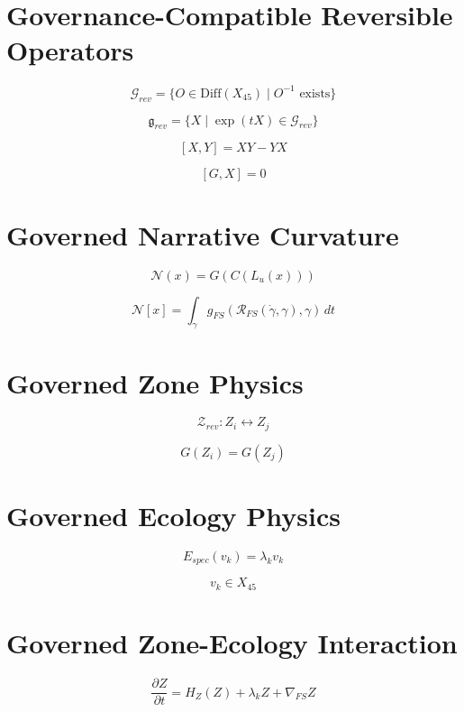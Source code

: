 \section*{Governance-Compatible Reversible Operators}

\[
\mathcal{G}_{rev}
= \{ O \in \mathrm{Diff}(X_{45}) \mid O^{-1} \text{ exists} \}
\]

\[
\mathfrak{g}_{rev}
= \{ X \mid \exp(tX) \in \mathcal{G}_{rev} \}
\]

\[
[X,Y] = XY - YX
\]

\[
[G,X] = 0
\]


\section*{Governed Narrative Curvature}

\[
\mathcal{N}(x)
= G(C(L_u(x)))
\]

\[
\mathcal{N}[x]
= \int_{\gamma}
g_{FS}(\mathcal{R}_{FS}(\dot{\gamma},\gamma), \gamma)\, dt
\]


\section*{Governed Zone Physics}

\[
\mathcal{Z}_{rev} : Z_i \leftrightarrow Z_j
\]

\[
G(Z_i) = G(Z_j)
\]


\section*{Governed Ecology Physics}

\[
E_{spec}(v_k) = \lambda_k v_k
\]

\[
v_k \in X_{45}
\]


\section*{Governed Zone-Ecology Interaction}

\[
\frac{\partial Z}{\partial t}
= H_Z(Z)
+ \lambda_k Z
+ \nabla_{FS} Z
\]

